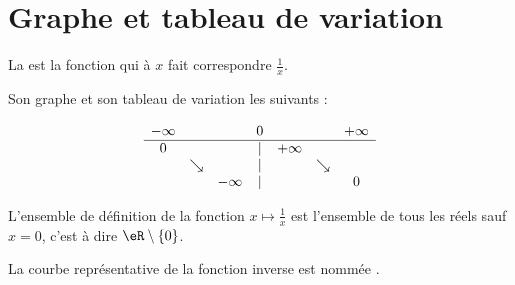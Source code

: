 
\section{Graphe et tableau de variation}

\begin{definition}
La  est la fonction qui à \( x\) fait correspondre \( \frac{1}{ x }\).
\end{definition}

Son graphe et son tableau de variation les suivants : 
\begin{multicols}{2}

\begin{equation*}
    \begin{array}[]{ccccccc}
        -\infty&&&0&&&+\infty\\
        \hline
        0&&&|&+\infty&&\\
        &\searrow&&|&&\searrow&\\
        &&-\infty&|&&&0\\
    \end{array}
\end{equation*}

\columnbreak

\begin{center}

\end{center}
\end{multicols}

L'ensemble de définition de la fonction \( x\mapsto \frac{1}{ x }\) est l'ensemble de tous les réels sauf \( x=0\), c'est à dire \( \eR\setminus\{ 0 \}\).

\begin{definition}
    La courbe représentative de la fonction inverse est nommée .
\end{definition}

